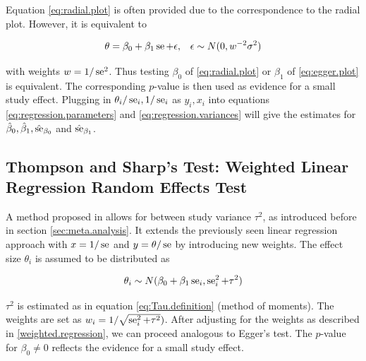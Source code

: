 \documentclass[11pt,a4paper,twoside]{book}\usepackage[]{graphicx}\usepackage[]{color}
\begin{document}
Equation \eqref{eq:radial.plot} is often provided due to the correspondence to the radial plot. However, it is equivalent to

\begin{align}
\theta &= \beta_0 + \beta_1 \operatorname{se} + \epsilon, & \epsilon \sim N(0, w^{-2}\sigma^2) \label{eq:egger.plot}
\end{align}

with weights $w = 1/\operatorname{se}^2$. Thus testing $\beta_0$ of \eqref{eq:radial.plot} or $\beta_1$ of \eqref{eq:egger.plot} is equivalent. The corresponding $p$\hspace{0.4mm}-value is then used as evidence for a small study effect. Plugging in  $\theta_i/\operatorname{se}_i, 1/\operatorname{se}_i$ as $y_i, x_i$ into equations \eqref{eq:regression.parameters} and \eqref{eq:regression.variances} will give the estimates for $\hat{\beta}_0, \hat{\beta}_1,\hat{\operatorname{se}}_{\beta_0}$ and $\hat{\operatorname{se}}_{\beta_1}$.



\subsection{Thompson and Sharp's Test: Weighted Linear Regression Random Effects Test} \label{sec:Thompson}
A method proposed in \citet{thompson.sharp} allows for between study variance $\tau^2$, as introduced before in section \ref{sec:meta.analysis}. It extends the previously seen linear regression approach with $x = 1/\operatorname{se}$ and $y = \theta/\operatorname{se}$ by introducing new weights. The effect size $\theta_i$ is assumed to be distributed as

\begin{align}
\theta_i \sim N(\beta_0 + \beta_1 \operatorname{se}_i, \operatorname{se}_i^2 + \tau^2) \label{t.sharp.regression}
\end{align}

$\tau^2$ is estimated as in equation \eqref{eq:Tau.definition} (method of moments). %
The weights are set as $w_i = 1/\sqrt{\operatorname{se}_i^2 + \tau^2})$. After adjusting for the weights as described in \ref{weighted.regression}, we can proceed analogous to Egger's test. The $p$\hspace{0.4mm}-value for $\beta_{0} \neq 0$ reflects the evidence for a small study effect.
\end{document}
